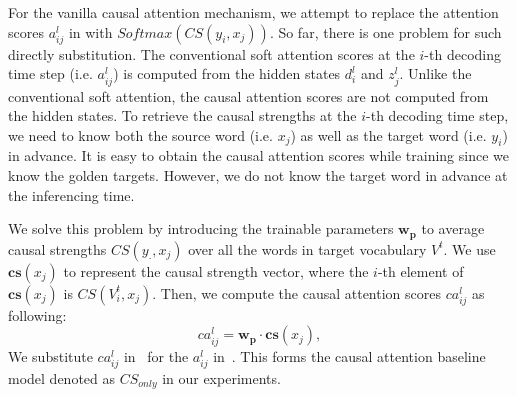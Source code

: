 For the vanilla causal attention mechanism, 
we attempt to replace the attention scores $a^l_{ij}$ in  with $Softmax\left( CS(y_i, x_j) \right)$.
So far, there is one problem for such directly substitution.
The conventional soft attention scores at the $i$-th decoding time step  (i.e. $a^{l}_{ij}$) is computed from the hidden states $d^l_i$ and $z^l_j$. 
Unlike the conventional soft attention,
the causal attention scores are not computed from the hidden states.
To retrieve the causal strengths at the $i$-th decoding time step, we need to know both the source word (i.e. $x_j$) as well as the target word (i.e. $y_i$) in advance.
It is easy to obtain the causal attention scores while training since we know the golden targets.
However, we do not know the target word in advance
at the inferencing time. 

We solve this problem by introducing the
trainable parameters $\mathbf{w_p}$ to average causal strengths $CS(y_{\cdot}, x_j)$ over all the words in target vocabulary $V^t$. We use $\mathbf{cs}(x_j)$ to represent
the causal strength vector, where  the $i$-th element of $\mathbf{cs}(x_j)$ is $CS(V^t_i, x_j)$.
Then, we compute the causal attention scores $ca^l_{ij}$ as following:
\begin{equation}
\label{eq:ca} %
ca^{l} _ { i j }= \mathbf{w_p} \cdot
\mathbf{cs}(x_j) ,
\end{equation}
We substitute $ca^{l} _ { i j }$ in~ for the $a^l_{ij}$ in~.
This forms the causal attention baseline model denoted as
$CS_{only}$ in our experiments.




